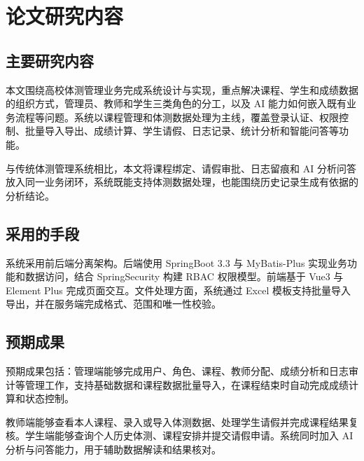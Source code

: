 \section{论文研究内容}

\subsection{主要研究内容}

本文围绕高校体测管理业务完成系统设计与实现，重点解决课程、学生和成绩数据的组织方式，管理员、教师和学生三类角色的分工，以及 AI 能力如何嵌入既有业务流程等问题。系统以课程管理和体测数据处理为主线，覆盖登录认证、权限控制、批量导入导出、成绩计算、学生请假、日志记录、统计分析和智能问答等功能。

与传统体测管理系统相比，本文将课程绑定、请假审批、日志留痕和 AI 分析问答放入同一业务闭环，系统既能支持体测数据处理，也能围绕历史记录生成有依据的分析结论。

\subsection{采用的手段}

系统采用前后端分离架构。后端使用 SpringBoot 3.3 与 MyBatis-Plus 实现业务功能和数据访问，结合 SpringSecurity 构建 RBAC 权限模型。前端基于 Vue3 与 Element Plus 完成页面交互。文件处理方面，系统通过 Excel 模板支持批量导入导出，并在服务端完成格式、范围和唯一性校验。

\subsection{预期成果}

预期成果包括：管理端能够完成用户、角色、课程、教师分配、成绩分析和日志审计等管理工作，支持基础数据和课程数据批量导入，在课程结束时自动完成成绩计算和状态控制。

教师端能够查看本人课程、录入或导入体测数据、处理学生请假并完成课程结果复核。学生端能够查询个人历史体测、课程安排并提交请假申请。系统同时加入 AI 分析与问答能力，用于辅助数据解读和结果核对。
